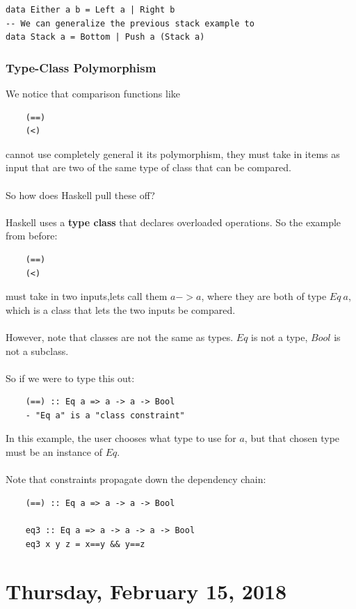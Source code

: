\documentclass[12pt]{article}
\begin{document}
\begin{lstlisting}
data Either a b = Left a | Right b
-- We can generalize the previous stack example to
data Stack a = Bottom | Push a (Stack a)
\end{lstlisting}

\subsubsection{Type-Class Polymorphism}

We notice that comparison functions like
\begin{lstlisting}
	(==)
	(<)
\end{lstlisting}
cannot use completely general it its polymorphism, they must take in items as input that are two of the same type of class that can be compared.\\
\\
So how does Haskell pull these off?\\
\\
Haskell uses a \textbf{type class} that declares overloaded operations. So the example from before:
\begin{lstlisting}
	(==)
	(<)
\end{lstlisting}
must take in two inputs,lets call them $a->a$, where they are both of type $Eq\: a$, which is a class that lets the two inputs be compared.\\
\\
However, note that classes are not the same as types. $Eq$ is not a type, $Bool$ is not a subclass.\\
\\
So if we were to type this out:
\begin{lstlisting}
	(==) :: Eq a => a -> a -> Bool
	- "Eq a" is a "class constraint"
\end{lstlisting}
In this example, the user chooses what type to use for $a$, but that chosen type must be an instance of $Eq$.\\
\\
Note that constraints propagate down the dependency chain:
\begin{lstlisting}
	(==) :: Eq a => a -> a -> Bool

	eq3 :: Eq a => a -> a -> a -> Bool
	eq3 x y z = x==y && y==z
\end{lstlisting}

\newpage

\section{Thursday, February 15, 2018}
\end{document}
